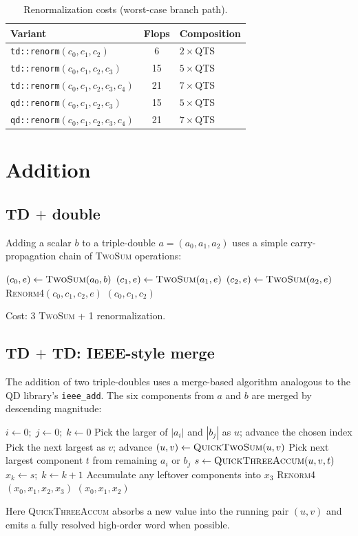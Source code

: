 \documentclass[11pt,a4paper]{article}
\begin{document}
\begin{table}[h]
\centering
\caption{Renormalization costs (worst-case branch path).}
\label{tab:renorm-costs}
\begin{tabular}{lcl}
\toprule
Variant & Flops & Composition \\
\midrule
\texttt{td::renorm}$(c_0,c_1,c_2)$             & 6  & $2\times$QTS \\
\texttt{td::renorm}$(c_0,c_1,c_2,c_3)$         & 15 & $5\times$QTS \\
\texttt{td::renorm}$(c_0,c_1,c_2,c_3,c_4)$     & 21 & $7\times$QTS \\
\texttt{qd::renorm}$(c_0,c_1,c_2,c_3)$         & 15 & $5\times$QTS \\
\texttt{qd::renorm}$(c_0,c_1,c_2,c_3,c_4)$     & 21 & $7\times$QTS \\
\bottomrule
\end{tabular}
\end{table}


\section{Addition}
\label{sec:add}

\subsection{TD $+$ double}

Adding a scalar $b$ to a triple-double $a = (a_0, a_1, a_2)$ uses
a simple carry-propagation chain of \textsc{TwoSum} operations:
\begin{algorithmic}[1]
\State $(c_0, e) \gets \textsc{TwoSum}(a_0, b)$
\State $(c_1, e) \gets \textsc{TwoSum}(a_1, e)$
\State $(c_2, e) \gets \textsc{TwoSum}(a_2, e)$
\State \textsc{Renorm4}$(c_0, c_1, c_2, e)$
\State \Return $(c_0, c_1, c_2)$
\end{algorithmic}
Cost: 3 \textsc{TwoSum} + 1 renormalization.

\subsection{TD $+$ TD: IEEE-style merge}

The addition of two triple-doubles uses a merge-based algorithm
analogous to the QD library's \texttt{ieee\_add}.  The six components
from $a$ and $b$ are merged by descending magnitude:
\begin{algorithmic}[1]
\State $i \gets 0;\; j \gets 0;\; k \gets 0$
\State Pick the larger of $|a_i|$ and $|b_j|$ as $u$; advance the
  chosen index
\State Pick the next largest as $v$; advance
\State $(u, v) \gets \textsc{QuickTwoSum}(u, v)$
  \State Pick next largest component $t$ from remaining $a_i$ or $b_j$
  \State $s \gets \textsc{QuickThreeAccum}(u, v, t)$
   $x_k \gets s;\; k \gets k + 1$ \EndIf
\EndWhile
\State Accumulate any leftover components into $x_3$
\State \textsc{Renorm4}$(x_0, x_1, x_2, x_3)$
\State \Return $(x_0, x_1, x_2)$
\end{algorithmic}
Here \textsc{QuickThreeAccum} absorbs a new value into the running
pair $(u, v)$ and emits a fully resolved high-order word when
possible.
\end{document}

